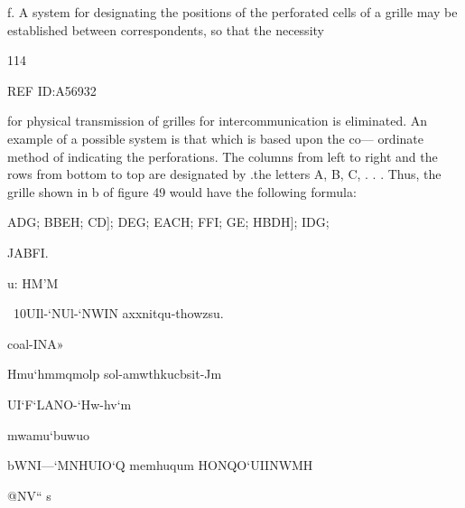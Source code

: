 f. A system for designating the positions of the perforated cells of a
grille may be established between correspondents, so that the necessity

114

 

REF ID:A56932

for physical transmission of grilles for intercommunication is eliminated.
An example of a possible system is that which is based upon the co—
ordinate method of indicating the perforations. The columns from left
to right and the rows from bottom to top are designated by .the letters
A, B, C, . . . Thus, the grille shown in b of ﬁgure 49 would have the
following formula:

ADG; BBEH; CD]; DEG; EACH; FFI; GE; HBDH]; IDG;

JABFI.

 

 

 

 

u: HM'M

 

 

 

 

 

 

~10UIl-‘NUl-‘NWIN
axxnitqu-thowzsu.

coal-INA»

 

Hmu‘hmmqmolp
sol-amwthkucbsit-Jm

 

 

 

 

 

UI‘F‘LANO-‘Hw-hv‘m

 

 

 

mwamu‘buwuo

 

 

bWNI—‘MNHUIO‘Q
memhuqum
HONQO‘UIINWMH

 

 

 

 

@NV“
s\\
\V

\V \V

\V
\
\V
\

 

